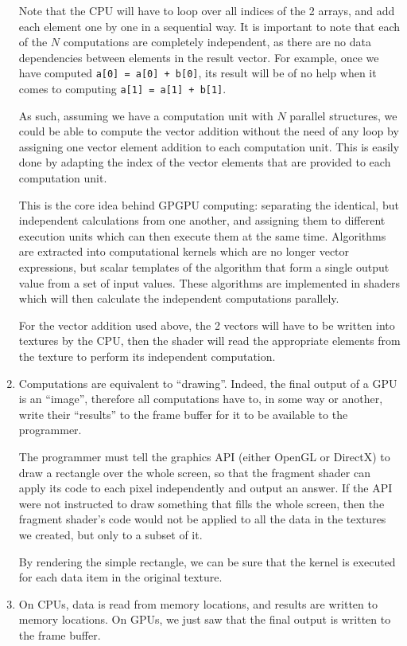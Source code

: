\documentclass[12pt, a4paper]{report}
\begin{document}
\begin{enumerate}
Note that the CPU will have to loop over all indices of the 2 arrays, and add
each element one by one in a sequential way.
It is important to note that each of the $N$ computations are completely
independent, as there are no data dependencies between elements in the result
vector.
For example, once we have computed \verb!a[0] = a[0] + b[0]!, its result will be
of no help when it comes to computing \verb!a[1] = a[1] + b[1]!.

As such, assuming we have a computation unit with $N$ parallel structures, we
could be able to compute the vector addition without the need of any loop by
assigning one vector element addition to each computation unit.
This is easily done by adapting the index of the vector elements that are
provided to each computation unit.

This is the core idea behind GPGPU computing: separating the identical, but
independent calculations from one another, and assigning them to different
execution units which can then execute them at the same time.
Algorithms are extracted into computational kernels which are no longer vector
expressions, but scalar templates of the algorithm that form a single output
value from a set of input values.
These algorithms are implemented in shaders which will then calculate the
independent computations parallely.

For the vector addition used above, the 2 vectors will have to be written into
textures by the CPU, then the shader will read the appropriate elements from the
texture to perform its independent computation.

\item Computations are equivalent to ``drawing''.
Indeed, the final output of a GPU is an ``image'', therefore all computations
have to, in some way or another, write their ``results'' to the frame buffer for
it to be available to the programmer.

The programmer must tell the graphics API (either OpenGL or DirectX) to draw a
rectangle over the whole screen, so that the fragment shader can apply its code
to each pixel independently and output an answer.
If the API were not instructed to draw something that fills the whole screen,
then the fragment shader's code would not be applied to all the data in the
textures we created, but only to a subset of it.

By rendering the simple rectangle, we can be sure that the kernel is executed
for each data item in the original texture.

\item On CPUs, data is read from memory locations, and results are written to
memory locations.
On GPUs, we just saw that the final output is written to the frame buffer.


\end{enumerate}
\end{document}

